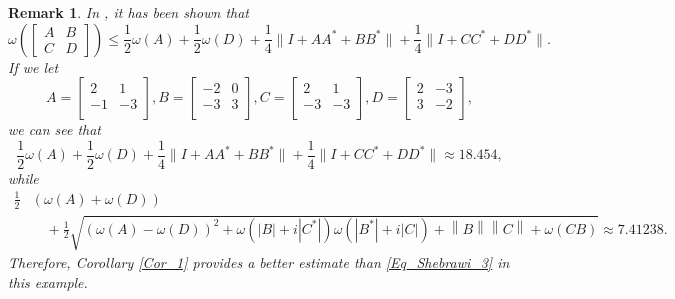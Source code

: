 \documentclass[12pt,twoside,reqno]{amsart}
\newtheorem{remark}{Remark}[section]
\numberwithin{equation}{section}
\begin{document}
\begin{remark}
In \cite{Shebrawi_LAA_2017}, it has been shown that
\begin{equation}\label{Eq_Shebrawi_3}
\omega\!\left(
\begin{bmatrix}
A & B \\
C & D
\end{bmatrix}
\right)
\leq \frac{1}{2} \omega(A)
+ \frac{1}{2} \omega(D)
+ \frac{1}{4} \bigl\| I + AA^{*} + BB^{*} \bigr\|
+ \frac{1}{4} \bigl\| I + CC^{*} + DD^{*} \bigr\|.
\end{equation}
If we let \[A=\left[
\begin{array}{cc}
 2 & 1 \\
 -1 & -3 \\
\end{array}
\right], B=\left[
\begin{array}{cc}
 -2 & 0 \\
 -3 & 3 \\
\end{array}
\right], C=\left[
\begin{array}{cc}
 2 & 1 \\
 -3 & -3 \\
\end{array}
\right], D=\left[
\begin{array}{cc}
 2 & -3 \\
 3 & -2 \\
\end{array}
\right],\]
we can see that
\[\frac{1}{2} \omega(A)
+ \frac{1}{2} \omega(D)
+ \frac{1}{4} \bigl\| I + AA^{*} + BB^{*} \bigr\|
+ \frac{1}{4} \bigl\| I + CC^{*} + DD^{*} \bigr\|\approx 18.454,\]
while
\[\begin{aligned}
  \frac{1}{2}&\left( \omega \left( A \right)+\omega \left( D \right) \right) \\ 
 &\quad +\frac{1}{2}\sqrt{{{\left( \omega \left( A \right)-\omega \left( D \right) \right)}^{2}}+\omega \left( \left| B \right|+i\left| {{C}^{*}} \right| \right)\omega \left( \left| {{B}^{*}} \right|+i\left| C \right| \right)+\left\| B \right\|\left\| C \right\|+\omega \left( CB \right)}\approx 7.41238.  
\end{aligned}\]
Therefore, Corollary \ref{Cor_1} provides a better estimate than \eqref{Eq_Shebrawi_3} in this example.
\end{remark}
\end{document}
